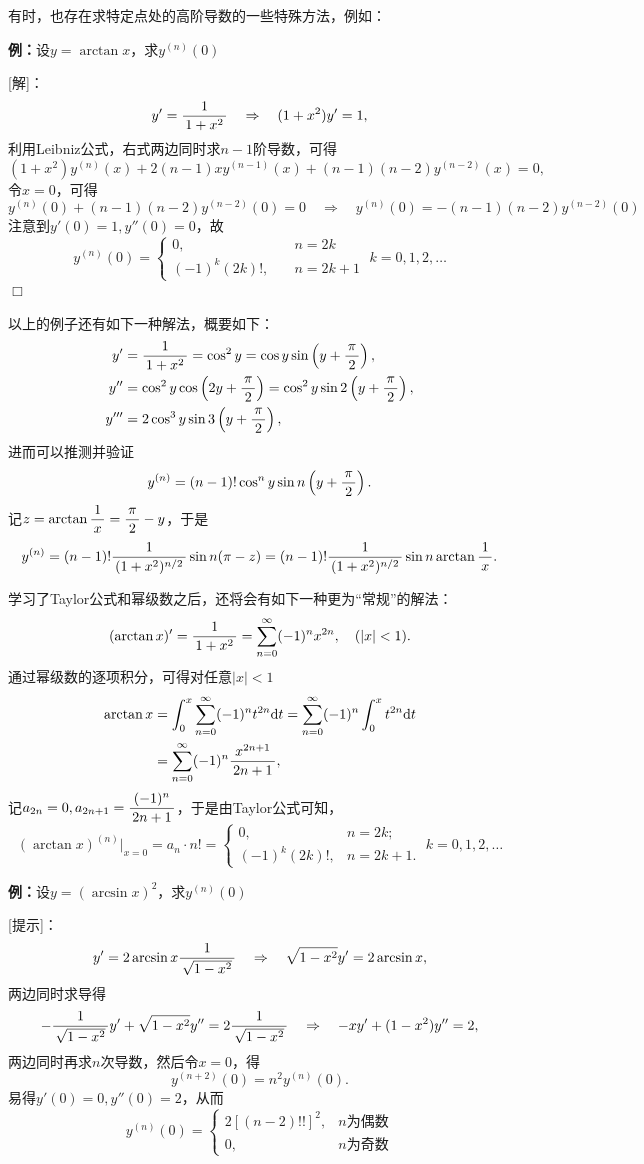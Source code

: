有时，也存在求特定点处的高阶导数的一些特殊方法，例如：

{\bf 例：}设$y=\arctan x$，求$y^{(n)}(0)$

[解]：
$$y'=\displaystyle\frac{\,{1}\,}{\,{1+x^2}\,}\quad \Rightarrow\quad (1+x^2)y'=1,$$
利用Leibniz公式，右式两边同时求$n-1$阶导数，可得
$$(1+x^2)y^{(n)}(x)+2(n-1)xy^{(n-1)}(x)+(n-1)(n-2)y^{(n-2)}(x)=0,$$
令$x=0$，可得
$$y^{(n)}(0)+(n-1)(n-2)y^{(n-2)}(0)=0\quad
\Rightarrow\quad y^{(n)}(0)=-(n-1)(n-2)y^{(n-2)}(0)$$
注意到$y'(0)=1,y''(0)=0$，故
$$y^{(n)}(0)=\left\{\begin{array}{ll}
0,\quad& n=2k\\
(-1)^k(2k)!,\quad& n=2k+1
\end{array}\right.\;k=0,1,2,\ldots$$
\hfill$\Box$

\begin{shaded}
以上的例子还有如下一种解法，概要如下：
\begin{align*}
	y'&=\displaystyle\frac{\,{1}\,}{\,{1+x^2}\,}=\cos^2y=\cos y\sin\left(y+\displaystyle\frac{\,{\pi}\,}{\,{2}\,}\right),\\
	y''&=\cos^2y\cos\left(2y+\displaystyle\frac{\,{\pi}\,}{\,{2}\,}\right)
	=\cos^2y\sin2\left(y+\displaystyle\frac{\,{\pi}\,}{\,{2}\,}\right),\\
	y'''&=2\cos^3y\sin3\left(y+\displaystyle\frac{\,{\pi}\,}{\,{2}\,}\right),
\end{align*}
进而可以推测并验证
$$y^{(n)}=(n-1)!\cos^ny\sin n\left(y+\displaystyle\frac{\,{\pi}\,}{\,{2}\,}\right).$$
记$z=\arctan\displaystyle\frac{\,{1}\,}{\,{x}\,}=\displaystyle\frac{\,{\pi}\,}{\,{2}\,}-y$，于是
$$y^{(n)}=(n-1)!\displaystyle\frac{\,{1}\,}{\,{(1+x^2)^{n/2}}\,}\sin n(\pi-z)=
(n-1)!\displaystyle\frac{\,{1}\,}{\,{(1+x^2)^{n/2}}\,}\sin n\arctan\displaystyle\frac{\,{1}\,}{\,{x}\,}.$$

学习了Taylor公式和幂级数之后，还将会有如下一种更为“常规”的解法：
$$(\arctan x)'=\displaystyle\frac{\,{1}\,}{\,{1+x^2}\,}=\sum\limits_{n=0}^{\infty}(-1)^nx^{2n},
\quad (|x|<1).$$ 
通过幂级数的逐项积分，可得对任意$|x|<1$
\begin{align*}
	\arctan x&=\displaystyle\int_0^x\sum\limits_{n=0}^{\infty}(-1)^nt^{2n}\mathrm{d} t
	=\sum\limits_{n=0}^{\infty}(-1)^n\displaystyle\int_0^xt^{2n}\mathrm{d} t\\
	&=\sum\limits_{n=0}^{\infty}(-1)^n\displaystyle\frac{\,{x^{2n+1}}\,}{\,{2n+1}\,},
\end{align*}
记$a_{2n}=0,a_{2n+1}=\displaystyle\frac{\,{(-1)^n}\,}{\,{2n+1}\,}$，于是由Taylor公式可知，
$$(\arctan x)^{(n)}|_{x=0}=a_n\cdot n!
=\left\{\begin{array}{ll}
	0,& n=2k;\\ (-1)^k(2k)!, & n=2k+1.
\end{array}\right.\;k=0,1,2,\ldots$$
\end{shaded}

{\bf 例：}设$y=(\arcsin x)^2$，求$y^{(n)}(0)$

[提示]：
$$y'=2\arcsin x\displaystyle\frac{\,{1}\,}{\,{\sqrt{1-x^2}}\,}\quad
\Rightarrow\quad \sqrt{1-x^2}y'=2\arcsin x,$$
两边同时求导得
$$-\displaystyle\frac{\,{1}\,}{\,{\sqrt{1-x^2}}\,}y'+\sqrt{1-x^2}y''=2\displaystyle\frac{\,{1}\,}{\,{\sqrt{1-x^2}}\,}\quad
\Rightarrow\quad-xy'+(1-x^2)y''=2,$$
两边同时再求$n$次导数，然后令$x=0$，得
$$y^{(n+2)}(0)=n^2y^{(n)}(0).$$
易得$y'(0)=0,y''(0)=2$，从而
$$y^{(n)}(0)=\left\{\begin{array}{ll}
2[(n-2)!!]^2,& n\mbox{为偶数}\\
0,& n\mbox{为奇数}
\end{array}\right.$$

